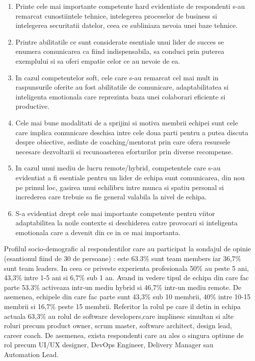 \documentclass[a4paper, 12pt]{article}
\begin{document}
	\begin{enumerate}[(1)]

	\item Printe cele mai importante competente hard evidentiate de respondenti s-au remarcat cunostiintele tehnice, intelegerea proceselor de business si intelegerea securitatii datelor, ceea ce subliniaza nevoia unei baze tehnice.

	\item Printre abilitatile ce sunt considerate esentiale unui lider de succes se enumera comunicarea ca fiind indispensabila, sa conduci prin puterea exemplului si sa oferi empatie celor ce au nevoie de ea.

	\item In cazul competentelor soft, cele care s-au remarcat cel mai mult in raspunsurile oferite au fost abilitatile de comunicare, adaptabilitatea si inteligenta emotionala care reprezinta baza unei colaborari eficiente si productive.

	\item Cele mai bune modalitati de a sprijini si motiva membrii echipei sunt cele care implica comunicare deschisa intre cele doua parti pentru a putea discuta despre obiective, sedinte de coaching/mentorat prin care ofera resursele necesare dezvoltarii si recunoasterea eforturilor prin diverse recompense.

	\item In cazul unui mediu de lucru remote/hybrid, competentele care s-au evidentiat a fi esentiale pentru un lider de echipa sunt comunicarea, din nou pe primul loc, gasirea unui echilibru intre munca si spatiu personal si increderea care trebuie sa fie general valabila la nivel de echipa.

	\item S-a evidentiat drept cele mai importante competente pentru viitor adaptabilitea la noile contexte si deschiderea catre provocari si inteligenta emotionala care a devenit din ce in ce mai importanta.

	\end{enumerate}
 	
\quad Profilul socio-demografic al respondentilor care au participat la sondajul de opinie (esantionul fiind de 30 de persoane) : este 63.3\% sunt team members iar 36,7\% sunt team leaders.  In ceea ce priveste experienta profesionala 50\% au peste 5 ani, 43,3\% intre 1-5 ani si 6,7\% sub 1 an. Avand in vedere tipul de echipa din care fac parte 53.3\% activeaza intr-un mediu hybrid si 46,7\% intr-un mediu remote. De asemenea, echipele din care fac parte sunt 43,3\% sub 10 membrii, 40\% intre 10-15 membrii si 16,7\% peste 15 membrii.  Referitor la rolul pe care il detin in echipa actuala 63,3\% au rolul de software developers,care implinesc simultan si alte roluri precum product owner, scrum master, software architect, design lead, career coach. De asemenea, exista respondenti care au ales o singura optiune de rol precum UI/UX designer, DevOps Engineer, Delivery Manager sau Automation Lead.
\newpage
\end{document}
